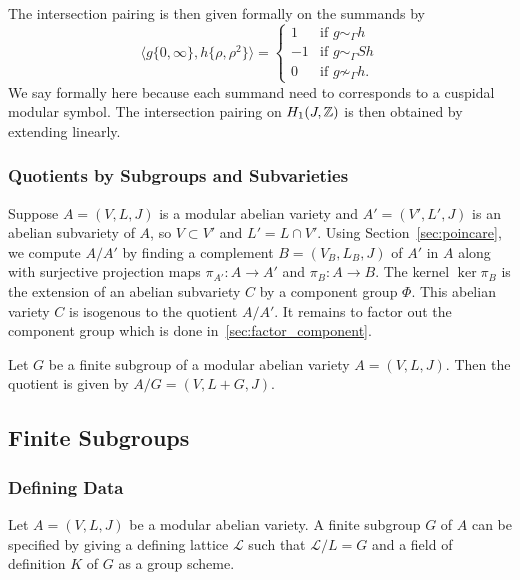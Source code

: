 \documentclass{article}
\begin{document}
The intersection pairing is then given formally on the summands by
\[
    \langle g\{0,\infty\}, h\{\rho, \rho^2\} \rangle
    =
    \begin{cases}
        1  & \text{if } g\sim_\Gamma h      \\
        -1 & \text{if } g\sim_\Gamma Sh     \\
        0  & \text{if } g\not\sim_\Gamma h.
    \end{cases}
\]
We say formally here because each summand need to corresponds to a cuspidal
modular symbol. The intersection pairing on $H_1(J, \mathbb{Z})$ is then obtained by
extending linearly.


\subsubsection{Quotients by Subgroups and Subvarieties}

\label{sec:quotients}

Suppose $A = (V, L, J)$ is a modular abelian variety and $A' = (V',
L', J)$ is an abelian subvariety of $A$, so $V\subset V'$ and $L' =
L\cap V'$. Using Section~\ref{sec:poincare}, we compute $A/A'$ by
finding a complement $B=(V_B,L_B,J)$ of $A'$ in $A$ along with
surjective projection maps $\pi_{A'}: A \to A'$ and $\pi_B: A\to B$.
The kernel $\ker \pi_B$ is the extension of an abelian subvariety $C$ by a
component group $\Phi$. This abelian variety $C$ is isogenous to the quotient
$A/A'$. It remains to factor out the component group which is done
in~\ref{sec:factor_component}.


Let $G$ be a finite subgroup of a modular abelian variety $A=(V, L, J)$. Then
the quotient is given by $A/G = (V, L+G, J)$.

\subsection{Finite Subgroups}

\subsubsection{Defining Data}

Let $A=(V, L, J)$ be a modular abelian variety. A finite subgroup $G$ of $A$
can be specified by giving a defining lattice $\mathcal{L}$ such that
$\mathcal{L}/L = G$ and a field of definition $K$ of $G$ as a group scheme.
\end{document}
